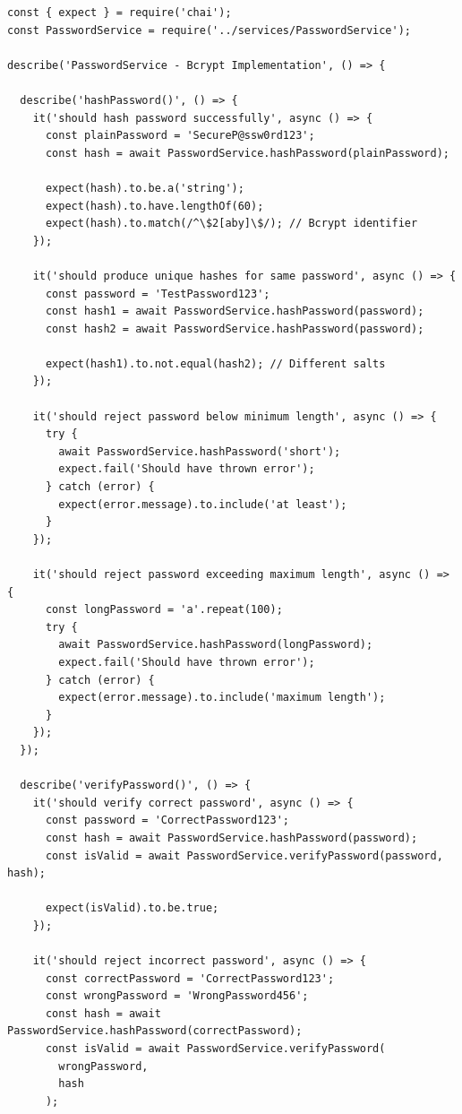 \documentclass[12pt,a4paper]{article}
\begin{document}
\begin{verbatim}
const { expect } = require('chai');
const PasswordService = require('../services/PasswordService');

describe('PasswordService - Bcrypt Implementation', () => {
  
  describe('hashPassword()', () => {
    it('should hash password successfully', async () => {
      const plainPassword = 'SecureP@ssw0rd123';
      const hash = await PasswordService.hashPassword(plainPassword);
      
      expect(hash).to.be.a('string');
      expect(hash).to.have.lengthOf(60);
      expect(hash).to.match(/^\$2[aby]\$/); // Bcrypt identifier
    });
    
    it('should produce unique hashes for same password', async () => {
      const password = 'TestPassword123';
      const hash1 = await PasswordService.hashPassword(password);
      const hash2 = await PasswordService.hashPassword(password);
      
      expect(hash1).to.not.equal(hash2); // Different salts
    });
    
    it('should reject password below minimum length', async () => {
      try {
        await PasswordService.hashPassword('short');
        expect.fail('Should have thrown error');
      } catch (error) {
        expect(error.message).to.include('at least');
      }
    });
    
    it('should reject password exceeding maximum length', async () => {
      const longPassword = 'a'.repeat(100);
      try {
        await PasswordService.hashPassword(longPassword);
        expect.fail('Should have thrown error');
      } catch (error) {
        expect(error.message).to.include('maximum length');
      }
    });
  });
  
  describe('verifyPassword()', () => {
    it('should verify correct password', async () => {
      const password = 'CorrectPassword123';
      const hash = await PasswordService.hashPassword(password);
      const isValid = await PasswordService.verifyPassword(password, hash);
      
      expect(isValid).to.be.true;
    });
    
    it('should reject incorrect password', async () => {
      const correctPassword = 'CorrectPassword123';
      const wrongPassword = 'WrongPassword456';
      const hash = await PasswordService.hashPassword(correctPassword);
      const isValid = await PasswordService.verifyPassword(
        wrongPassword, 
        hash
      );
      

\end{verbatim}
\end{document}
